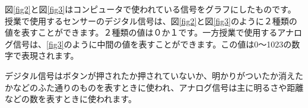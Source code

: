図\ref{fig2}と図\ref{fig3}はコンピュータで使われている信号をグラフにしたものです。授業で使用するセンサーのデジタル信号は、図\ref{fig2}と図\ref{fig3}のように２種類の値を表すことができます。２種類の値は０か１です。一方授業で使用するアナログ信号は、\ref{fig3}のように中間の値を表すことができます。この値は0〜1023の数字で表現されます。

デジタル信号はボタンが押されたか押されていないか、明かりがついたか消えたかなどのふた通りのものを表すときに使われ、アナログ信号は主に明るさや距離などの数を表すときに使われます。

\begin{tcolorbox}[title=\useOmetoi]
\begin{enumerate}
\end{enumerate}
\end{tcolorbox}
